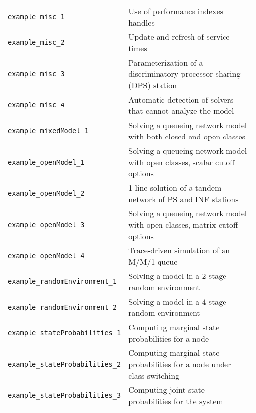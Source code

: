 {\begin{table}[thbp]
\begin{tabular}{|l|l|}
\hline
\texttt{example\_misc\_1} &  Use of performance indexes handles\\
\texttt{example\_misc\_2} &  Update and refresh of service times\\
\texttt{example\_misc\_3} &  Parameterization of a discriminatory processor sharing (DPS) station\\
\texttt{example\_misc\_4} &  Automatic detection of solvers that cannot analyze the model\\
\hline
\texttt{example\_mixedModel\_1} & Solving a queueing network model with both closed and open classes \\
\hline
\texttt{example\_openModel\_1} & Solving a queueing network model with open classes, scalar cutoff options \\
\texttt{example\_openModel\_2} & 1-line solution of a tandem network of PS and INF stations\\
\texttt{example\_openModel\_3} & Solving a queueing network model with open classes, matrix cutoff options \\
\texttt{example\_openModel\_4} & Trace-driven simulation of an M/M/1 queue\\
\hline
\texttt{example\_randomEnvironment\_1} &  Solving a model in a 2-stage random environment \\
\texttt{example\_randomEnvironment\_2} &  Solving a model in a 4-stage random environment \\
\hline
\texttt{example\_stateProbabilities\_1} &  Computing marginal state probabilities for a node\\
\texttt{example\_stateProbabilities\_2} &  Computing marginal state probabilities for a node under class-switching\\
\texttt{example\_stateProbabilities\_3} &  Computing joint state probabilities for the system\\
\hline
\end{tabular}
\label{TAB_examples_closedModel}
\end{table}
}

